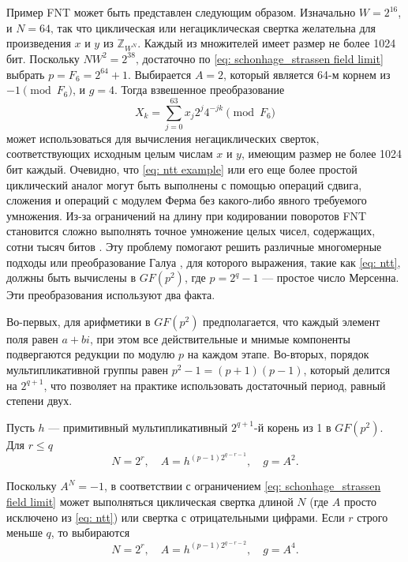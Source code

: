 Пример FNT может быть представлен следующим образом.
Изначально $W = 2^{16}$, и $N = 64$‚ так что циклическая или негациклическая свертка желательна для произведения $x$ и $y$ из $\mathbb{Z}_{W^N}$.
Каждый из множителей имеет размер не более 1024 бит.
Поскольку $N W^2  = 2^{38}$‚ достаточно по \eqref{eq: schonhage_strassen field limit} выбрать $p=F_6=2^64+1$.
Выбирается $A = 2$, который является 64-м корнем из $-1 \pmod{F_6}$, и $g = 4$.
Тогда взвешенное преобразование
\begin{equation}\label{eq: ntt example}
X_k = \sum_{j=0}^{63} x_j 2^j 4^{-jk} \pmod{F_6}
\end{equation}
может использоваться для вычисления негациклических сверток, соответствующих исходным целым числам $x$ и $y$, имеющим размер не более 1024 бит каждый.
Очевидно, что \eqref{eq: ntt example} или его еще более простой циклический аналог могут быть выполнены с помощью операций сдвига, сложения и операций с модулем Ферма без какого-либо явного требуемого умножения.
Из-за ограничений на длину при кодировании поворотов FNT становится сложно выполнять точное умножение целых чисел, содержащих, сотни тысяч битов \cite{ArithmeticWithNTT, NT-in-DSP}.
Эту проблему помогают решить различные многомерные подходы или преобразование Галуа \cite{FFT-over-FF}, для которого выражения, такие как \eqref{eq: ntt}, должны быть вычислены в $GF(p^2)$, где $p = 2^q - 1$ --- простое число Мерсенна.
Эти преобразования используют два факта.

Во-первых, для арифметики в $GF(p^2)$ предполагается, что каждый элемент поля равен $a + bi$, при этом все действительные и мнимые компоненты подвергаются редукции по модулю $p$ на каждом этапе.
Во-вторых, порядок мультипликативной группы равен $p^2-1=(p+1)(p-1)$, который делится на $2^{q + 1}$, что позволяет на практике использовать достаточный период, равный степени двух.

Пусть $h$ --- примитивный мультипликативный $2^{q + 1}$-й корень из 1 в $GF(p^2)$.
Для $r \leq q$
\begin{equation}\label{eq: simplifying ntt 1}
N = 2^r,\quad A=h^{(p-1) 2^{q-r-1}}, \quad g=A^2.
\end{equation}

Поскольку $A^N = -1$, в соответствии с ограничением \eqref{eq: schonhage_strassen field limit} может выполняться циклическая свертка длиной $N$ (где $A$ просто исключено из \eqref{eq: ntt}) или свертка с отрицательными цифрами.
Если $r$ строго меньше $q$, то выбираются
\begin{equation}\label{eq: simplifying ntt 2}
N = 2^r,\quad A=h^{(p-1) 2^{q-r-2}}, \quad g=A^4.
\end{equation}

